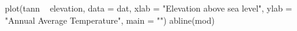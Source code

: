 \begin{Schunk}
\begin{Sinput}
 plot(tann ~ elevation, data = dat, xlab = "Elevation above sea level", 
      ylab = "Annual Average Temperature", main = "")
 abline(mod)
\end{Sinput}
\end{Schunk}
